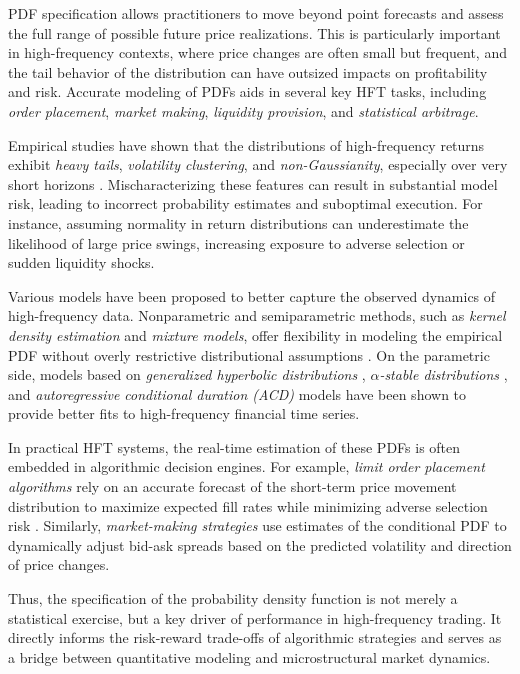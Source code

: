\documentclass[article]{abntex2}
\begin{document}
PDF specification allows practitioners to move beyond point forecasts and assess the full range of possible future price realizations. This is particularly important in high-frequency contexts, where price changes are often small but frequent, and the tail behavior of the distribution can have outsized impacts on profitability and risk. Accurate modeling of PDFs aids in several key HFT tasks, including \textit{order placement}, \textit{market making}, \textit{liquidity provision}, and \textit{statistical arbitrage}.

Empirical studies have shown that the distributions of high-frequency returns exhibit \textit{heavy tails}, \textit{volatility clustering}, and \textit{non-Gaussianity}, especially over very short horizons . Mischaracterizing these features can result in substantial model risk, leading to incorrect probability estimates and suboptimal execution. For instance, assuming normality in return distributions can underestimate the likelihood of large price swings, increasing exposure to adverse selection or sudden liquidity shocks.

Various models have been proposed to better capture the observed dynamics of high-frequency data. Nonparametric and semiparametric methods, such as \textit{kernel density estimation} and \textit{mixture models}, offer flexibility in modeling the empirical PDF without overly restrictive distributional assumptions . On the parametric side, models based on \textit{generalized hyperbolic distributions} , \textit{$\alpha$-stable distributions} , and \textit{autoregressive conditional duration (ACD)} models  have been shown to provide better fits to high-frequency financial time series.

In practical HFT systems, the real-time estimation of these PDFs is often embedded in algorithmic decision engines. For example, \textit{limit order placement algorithms} rely on an accurate forecast of the short-term price movement distribution to maximize expected fill rates while minimizing adverse selection risk . Similarly, \textit{market-making strategies} use estimates of the conditional PDF to dynamically adjust bid-ask spreads based on the predicted volatility and direction of price changes.

Thus, the specification of the probability density function is not merely a statistical exercise, but a key driver of performance in high-frequency trading. It directly informs the risk-reward trade-offs of algorithmic strategies and serves as a bridge between quantitative modeling and microstructural market dynamics.
\end{document}
